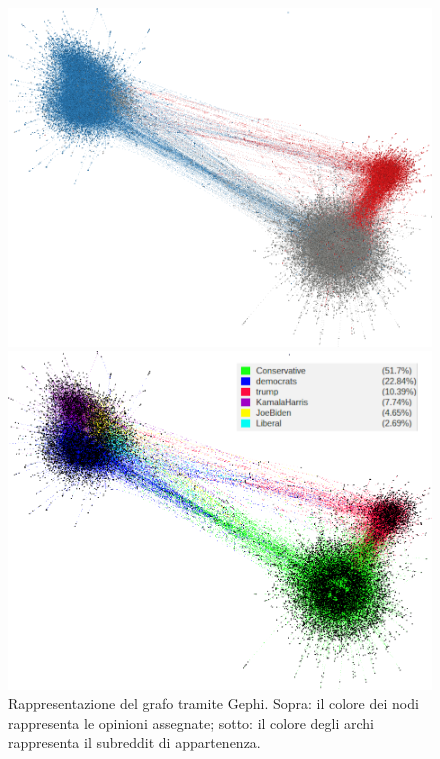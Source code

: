 \documentclass[sigchi]{acmart}
\begin{document}
\begin{figure}[h]
    \centering
    \begin{minipage}{0.48\textwidth}
        \centering
        \includegraphics[width=\linewidth]{img/full_graph_backbone_opinion3.png}
    \end{minipage}
    \hfill
    \begin{minipage}{0.48\textwidth}
        \centering
        \includegraphics[width=\linewidth]{img/full_graph_backbone_subreddits5.png}
    \end{minipage}
    \caption{Rappresentazione del grafo tramite Gephi. Sopra: il colore dei nodi rappresenta le opinioni assegnate; sotto: il colore degli archi rappresenta il subreddit di appartenenza. \label{fig:gephi_graph}}
\end{figure}
\end{document}
